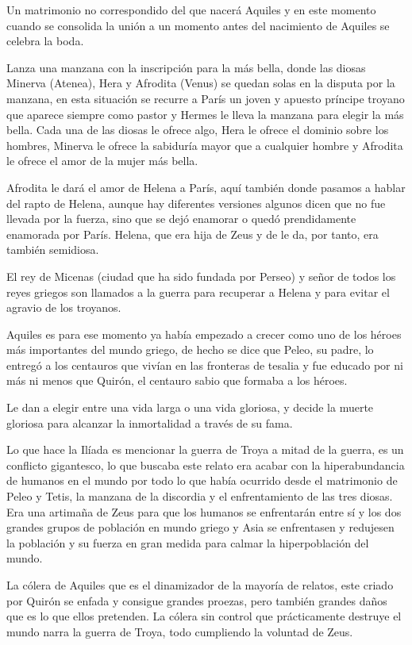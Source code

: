 Un matrimonio no correspondido del que nacerá Aquiles y en este momento cuando se consolida la unión a un momento antes del nacimiento de Aquiles se celebra la boda.

Lanza una manzana con la inscripción para la más bella, donde las diosas Minerva (Atenea), Hera y Afrodita (Venus) se quedan solas en la disputa por la manzana, en esta situación se recurre a París un joven y apuesto príncipe troyano que aparece siempre como pastor y Hermes le lleva la manzana para elegir la más bella. Cada una de las diosas le ofrece algo, Hera le ofrece el dominio sobre los hombres, Minerva le ofrece la sabiduría mayor que a cualquier hombre y Afrodita le ofrece el amor de la mujer más bella.

Afrodita le dará el amor de Helena a París, aquí también donde pasamos a hablar del rapto de Helena, aunque hay diferentes versiones algunos dicen que no fue llevada por la fuerza, sino que se dejó enamorar o quedó prendidamente enamorada por París. Helena, que era hija de Zeus y de le da, por tanto, era también semidiosa.

El rey de Micenas (ciudad que ha sido fundada por Perseo) y señor de todos los reyes griegos son llamados a la guerra para recuperar a Helena y para evitar el agravio de los troyanos.

Aquiles es para ese momento ya había empezado a crecer como uno de los héroes más importantes del mundo griego, de hecho se dice que Peleo, su padre, lo entregó a los centauros que vivían en las fronteras de tesalia y fue educado por ni más ni menos que Quirón, el centauro sabio que formaba a los héroes.

Le dan a elegir entre una vida larga o una vida gloriosa, y decide la muerte gloriosa para alcanzar la inmortalidad a través de su fama.

Lo que hace la Ilíada es mencionar la guerra de Troya a mitad de la guerra, es un conflicto gigantesco, lo que buscaba este relato era acabar con la hiperabundancia de humanos en el mundo por todo lo que había ocurrido desde el matrimonio de Peleo y Tetis, la manzana de la discordia y el enfrentamiento de las tres diosas. Era una artimaña de Zeus para que los humanos se enfrentarán entre sí y los dos grandes grupos de población en mundo griego y Asia se enfrentasen y redujesen la población y su fuerza en gran medida para calmar la hiperpoblación del mundo.

La cólera de Aquiles que es el dinamizador de la mayoría de relatos, este criado por Quirón se enfada y consigue grandes proezas, pero también grandes daños que es lo que ellos pretenden. La cólera sin control que prácticamente destruye el mundo narra la guerra de Troya, todo cumpliendo la voluntad de Zeus.

